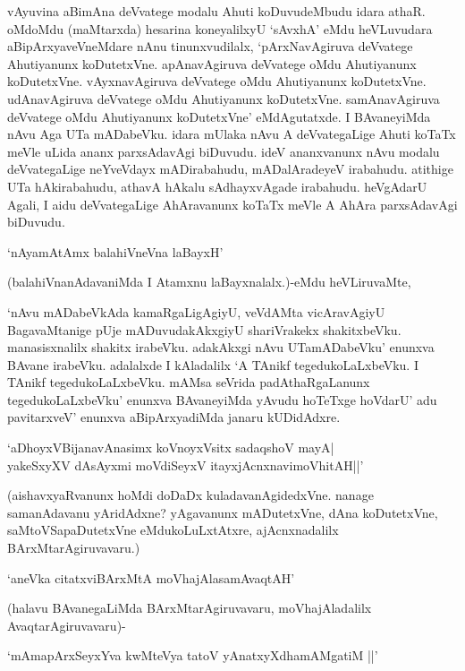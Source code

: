 vAyuvina aBimAna deVvatege modalu Ahuti koDuvudeMbudu idara athaR. oMdoMdu (maMtarxda) hesarina koneyalilxyU `sAvxhA' eMdu heVLuvudara aBipArxyaveVneMdare nAnu tinunxvudilalx, `pArxNavAgiruva deVvatege Ahutiyanunx koDutetxVne. apAnavAgiruva deVvatege oMdu Ahutiyanunx koDutetxVne. vAyxnavAgiruva deVvatege oMdu Ahutiyanunx koDutetxVne. udAnavAgiruva deVvatege oMdu Ahutiyanunx koDutetxVne. samAnavAgiruva deVvatege oMdu Ahutiyanunx koDutetxVne' eMdAgutatxde. I BAvaneyiMda nAvu Aga UTa mADabeVku. idara mUlaka nAvu A deVvategaLige Ahuti koTaTx meVle uLida ananx parxsAdavAgi biDuvudu. ideV ananxvanunx nAvu modalu deVvategaLige neYveVdayx mADirabahudu, mADalAradeyeV irabahudu. atithige UTa hAkirabahudu, athavA hAkalu sAdhayxvAgade irabahudu. heVgAdarU Agali, I aidu deVvategaLige AhAravanunx koTaTx meVle A AhAra parxsAdavAgi biDuvudu.

\begin{shloka}
`nAyamAtAmx balahiVneVna laBayxH'
\end{shloka}

(balahiVnanAdavaniMda I Atamxnu laBayxnalalx.)-eMdu heVLiruvaMte,

`nAvu mADabeVkAda kamaRgaLigAgiyU, veVdAMta vicAravAgiyU BagavaMtanige pUje mADuvudakAkxgiyU shariVrakekx shakitxbeVku. manasisxnalilx shakitx irabeVku. adakAkxgi nAvu UTamADabeVku' enunxva BAvane irabeVku. adalalxde I kAladalilx `A TAnikf tegedukoLaLxbeVku. I TAnikf tegedukoLaLxbeVku. mAMsa seVrida padAthaRgaLanunx tegedukoLaLxbeVku' enunxva BAvaneyiMda yAvudu hoTeTxge hoVdarU' adu pavitarxveV' enunxva aBipArxyadiMda janaru kUDidAdxre.

\begin{shloka}
`aDhoyxV\s BijanavAnasimx koV\s noyxV\s sitx sadaqshoV mayA|\\
yakeSxyXV dAsAyxmi moVdiSeyxV itayxjAcnxnavimoVhitAH||'
\end{shloka}

(aishavxyaRvanunx hoMdi doDaDx kuladavanAgidedxVne. nanage samanAdavanu yAridAdxne? yAgavanunx mADutetxVne, dAna koDutetxVne, saMtoVSapaDutetxVne eMdukoLuLxtAtxre, ajAcnxnadalilx BArxMtarAgiruvavaru.)

\begin{shloka}
`aneVka citatxviBArxMtA moVhajAlasamAvaqtAH'
\end{shloka}

(halavu BAvanegaLiMda BArxMtarAgiruvavaru, moVhajAladalilx Avaqta\-rAgiruvavaru)-

\begin{shloka}
`mAmapArxSeyxYva kwMteVya tatoV yAnatxyXdhamAMgatiM ||'
\end{shloka}

